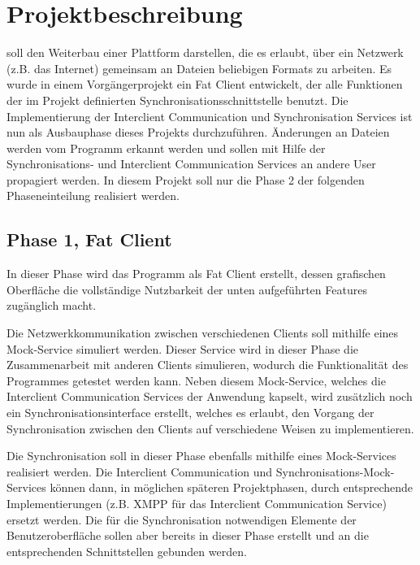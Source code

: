 
\section{Projektbeschreibung}

\sepmprojectname soll den Weiterbau einer Plattform darstellen, die es erlaubt, über ein Netzwerk (z.B. das Internet) gemeinsam an Dateien beliebigen Formats zu arbeiten. Es wurde in einem Vorgängerprojekt ein Fat Client entwickelt, der alle Funktionen der im Projekt definierten Synchronisationsschnittstelle benutzt. Die Implementierung der Interclient Communication und Synchronisation Services ist nun als Ausbauphase dieses Projekts durchzuführen. Änderungen an Dateien werden vom Programm erkannt werden und sollen mit Hilfe der Synchronisations- und Interclient Communication Services an andere User propagiert werden. In diesem Projekt soll nur die Phase 2 der folgenden Phaseneinteilung realisiert werden.

\subsection{Phase 1, Fat Client}
In dieser Phase wird das Programm als Fat Client erstellt, dessen grafischen Oberfläche die vollständige Nutzbarkeit der unten aufgeführten Features zugänglich macht.

Die Netzwerkkommunikation zwischen verschiedenen Clients soll mithilfe eines Mock-Service simuliert werden. Dieser Service wird in dieser Phase die Zusammenarbeit mit anderen Clients simulieren, wodurch die Funktionalität des Programmes getestet werden kann. Neben diesem Mock-Service, welches die Interclient Communication Services der Anwendung kapselt, wird zusätzlich noch ein Synchronisationsinterface erstellt, welches es erlaubt, den Vorgang der Synchronisation zwischen den Clients auf verschiedene Weisen zu implementieren.

Die Synchronisation soll in dieser Phase ebenfalls mithilfe eines Mock-Services realisiert werden. Die Interclient Communication und Synchronisations-Mock-Services können dann, in möglichen späteren Projektphasen, durch entsprechende Implementierungen (z.B. XMPP für das Interclient Communication Service) ersetzt werden. Die für die Synchronisation notwendigen Elemente der Benutzeroberfläche sollen aber bereits in dieser Phase erstellt und an die entsprechenden Schnittstellen gebunden werden.

